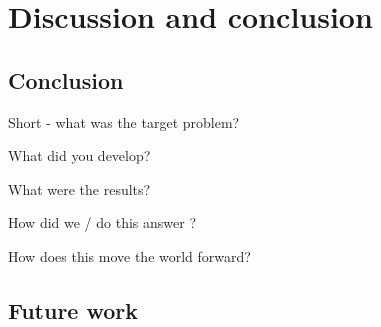 \chapter{Discussion and conclusion}\label{chapter:conclusion}
\section{Conclusion}\label{sec:concl}

Short - what was the target problem?


What did you develop?

What were the results?

How did we / do this answer ?

How does this move the world forward?

\section{Future work}\label{sec:fw}


